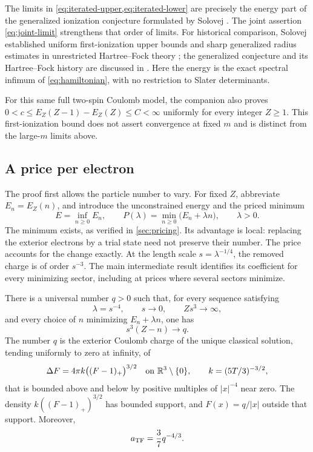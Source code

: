The limits in \cref{eq:iterated-upper,eq:iterated-lower} are precisely the
energy part of the generalized ionization conjecture formulated by
Solovej \cite[Section~3, Equation~(1)]{Solovej2016}. The joint assertion \cref{eq:joint-limit} strengthens that order of limits.
For historical comparison, Solovej established uniform first-ionization
upper bounds and sharp generalized radius estimates in unrestricted Hartree--Fock
theory \cite[Theorems~3.8 and~1.5]{Solovej2003}; the generalized conjecture
and its Hartree--Fock history are discussed in \cite[Section~3]{Solovej2016}.
Here the energy is the exact spectral infimum of
\cref{eq:hamiltonian}, with no restriction to Slater determinants.

For this same full two-spin Coulomb model, the companion
\cite[Corollary~1.3]{Foundation} also proves
$0<c\le E_Z(Z-1)-E_Z(Z)\le C<\infty$ uniformly for every integer $Z\ge1$.
This first-ionization bound does not assert convergence at fixed $m$ and
is distinct from the large-$m$ limits above.

\subsection{A price per electron}

The proof first allows the particle number to vary. For fixed $Z$, abbreviate
$E_n=E_Z(n)$, and introduce the unconstrained energy and the priced minimum
\[
 E=\inf_{n\ge0}E_n,\qquad
 P(\lambda)=\min_{n\ge0}\bigl(E_n+\lambda n\bigr),\qquad\lambda>0.
\]
The minimum exists, as verified in \cref{sec:pricing}. Its advantage is
local: replacing the exterior electrons by a trial state need not preserve
their number. The price accounts for the change exactly. At the length
scale $s=\lambda^{-1/4}$, the removed charge is of order $s^{-3}$.
The main intermediate result identifies its coefficient for every minimizing
sector, including at prices where several sectors minimize.

\begin{theorem}\label{thm:priced-deficit}
There is a universal number $q>0$ such that, for every sequence satisfying
\[
 \lambda=s^{-4},\qquad s\longrightarrow0,
 \qquad Zs^3\longrightarrow\infty,
\]
and every choice of $n$ minimizing $E_n+\lambda n$, one has
\[
 s^3(Z-n)\longrightarrow q.
\]
The number $q$ is the exterior Coulomb charge of the unique classical solution, tending uniformly to zero at infinity,
of
\[
 \Delta F=4\pi k\bigl((F-1)_+\bigr)^{3/2}
 \quad\text{on }\mathbb R^3\setminus\{0\},
 \qquad k=(5T/3)^{-3/2},
\]
that is bounded above and below by positive multiples of $|x|^{-4}$ near
zero. The density $k((F-1)_+)^{3/2}$ has bounded support, and
$F(x)=q/|x|$ outside that support.
Moreover,
\[
 a_{\mathrm{TF}}=\frac37q^{-4/3}.
\]
\end{theorem}

